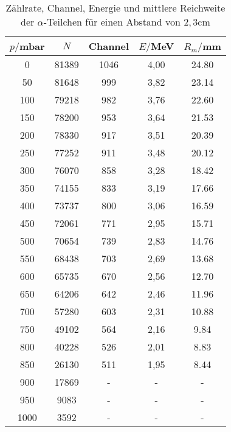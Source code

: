 \begin{table}[H]
  \centering
  \caption{Zählrate, Channel, Energie und mittlere Reichweite der $\alpha$-Teilchen für einen Abstand von $2,3$cm}
  \label{tab:Spannungsamplitude}
  \begin{tabular}{c c c c c}
    \toprule
    $p/$mbar & $N$ & Channel & $E/$MeV & $R_m/$mm \\
    \midrule
    0	  & 81389  &1046 &  4,00 & 24.80         \\
    50	&  81648  & 999 &  3,82 &  23.14        \\
    100 & 79218  & 982 &  3,76 & 22.60        \\
    150 & 78200  & 953 &  3,64 & 21.53        \\
    200 & 78330  & 917 &  3,51 & 20.39        \\
    250 & 77252  & 911 &  3,48 & 20.12        \\
    300 & 76070  & 858 &  3,28 & 18.42        \\
    350 & 74155  & 833 &  3,19 & 17.66        \\
    400 & 73737  & 800 &  3,06 & 16.59        \\
    450 & 72061  & 771 &  2,95 & 15.71        \\
    500 & 70654  & 739 &  2,83 & 14.76        \\
    550 & 68438  & 703 &  2,69 & 13.68        \\
    600 & 65735  & 670 &  2,56 & 12.70        \\
    650 & 64206  & 642 &  2,46 & 11.96        \\
    700 & 57280  & 603 &  2,31 & 10.88        \\
    750 & 49102  & 564 &  2,16 & 9.84        \\
    800 & 40228  & 526 &  2,01 & 8.83        \\
    850 & 26130  & 511 &  1,95 & 8.44        \\
    900 & 17869  &  -  & -    & -        \\
    950 & 9083	 &  -  & -    & -        \\
    1000& 3592   &  -  & -    & -        \\
    \bottomrule
  \end{tabular}
\end{table}

